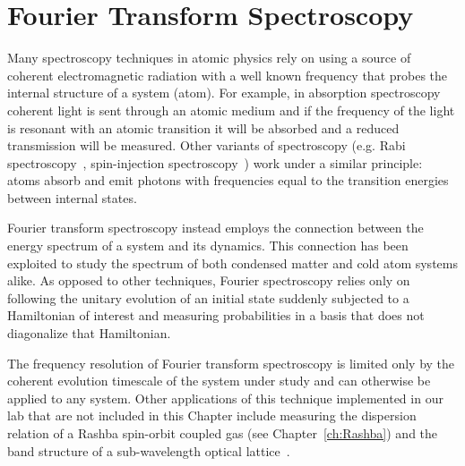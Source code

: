 

\renewcommand{\thechapter}{5}

\chapter{Fourier Transform Spectroscopy}
\label{ch:Fourier_spectroscopy}

Many spectroscopy techniques in atomic physics rely on using 
a source of coherent electromagnetic radiation with a well known frequency that probes the internal structure of a system (atom). For example, in absorption spectroscopy~\cite{demtroder_doppler-limited_2008} coherent light is sent through an atomic medium and if the frequency of the light is resonant with an atomic transition it will be absorbed and a reduced transmission will be measured. Other variants of spectroscopy (e.g. Rabi spectroscopy~\cite{rabi_space_1937}, spin-injection spectroscopy~\cite{cheuk_spin-injection_2012}) work under a similar principle: atoms absorb and emit photons with frequencies equal to the transition energies between internal states. 

Fourier transform spectroscopy instead employs the connection between the energy spectrum of a system and its dynamics. This connection has been exploited to study the spectrum of both condensed matter \cite{jonas_two-dimensional_2003} and cold atom systems \cite{yoshimura_diabatic-ramping_2014,wang_atom-interferometric_2015} alike.
As opposed to other techniques, Fourier spectroscopy relies only on following the unitary evolution of an initial state suddenly subjected to a Hamiltonian of interest and measuring probabilities in a basis that does not diagonalize that Hamiltonian. 

The frequency resolution of Fourier transform spectroscopy is limited only by the coherent evolution timescale of the system under study and can otherwise be applied to any system. Other applications of this technique implemented in our lab that are not included in this Chapter include measuring the dispersion relation of a Rashba spin-orbit coupled gas (see Chapter~\ref{ch:Rashba}) and the band structure of a sub-wavelength optical lattice~\cite{anderson_realization_2019}.


